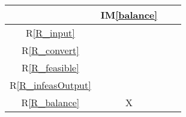 \documentclass[12pt]{article}
\newcommand{\iref}[1]{IM\ref{#1}}
\newcommand{\rref}[1]{R\ref{#1}}
\newcommand{\nfrref}[1]{NFR\ref{#1}}
\begin{document}
\begin{table}[h!]
  \parbox{.45\linewidth}{
    \centering
    \begin{tabular}{|c|c|c|c|}%
      \hline
                                     & \iref{balance} \\ %
      \hline
      \rref{R_input}                 &                \\ \hline %
      \rref{R_convert}               &                \\ \hline %
      \rref{R_feasible}              &                \\ \hline %
      \rref{R_infeasOutput}          &                \\ \hline %
      \rref{R_balance}               & X              \\ \hline %

\end{tabular}}
\end{table}
\end{document}
